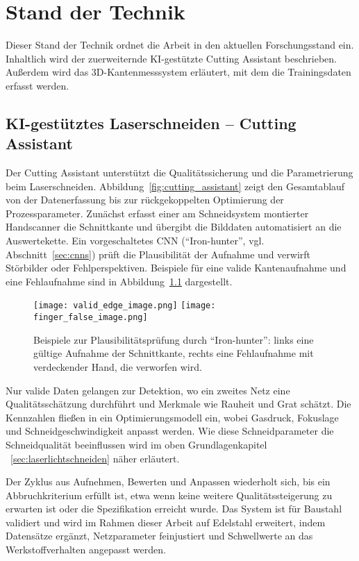 \chapter{Stand der Technik}

Dieser Stand der Technik ordnet die Arbeit in den aktuellen Forschungsstand ein. Inhaltlich wird der zuerweiternde KI-gestützte Cutting Assistant beschrieben. Außerdem wird das 3D-Kantenmesssystem erläutert, mit dem die Trainingsdaten erfasst werden.

\section{KI-gestütztes Laserschneiden – Cutting Assistant}
\label{sec:cutting-assistent}

Der Cutting Assistant unterstützt die Qualitätssicherung und die Parametrierung beim Laserschneiden. Abbildung~\ref{fig:cutting_assistant} zeigt den Gesamtablauf von der Datenerfassung bis zur rückgekoppelten Optimierung der Prozessparameter. Zunächst erfasst einer am Schneidsystem montierter Handscanner die Schnittkante und übergibt die Bilddaten automatisiert an die Auswertekette. Ein vorgeschaltetes CNN (\enquote{Iron-hunter}, vgl. Abschnitt~\ref{sec:cnns}) prüft die Plausibilität der Aufnahme und verwirft Störbilder oder Fehlperspektiven. Beispiele für eine valide Kantenaufnahme und eine Fehlaufnahme sind in Abbildung~\ref{fig:ok-nok-examples} dargestellt. 

\begin{figure}[!htbp]
    \centering
    \texttt{[image: valid\_edge\_image.png]}\hfill
    \texttt{[image: finger\_false\_image.png]}
    \caption{Beispiele zur Plausibilitätsprüfung durch \enquote{Iron-hunter}: links eine gültige Aufnahme der Schnittkante, rechts eine Fehlaufnahme mit verdeckender Hand, die verworfen wird.}
    \label{fig:ok-nok-examples}
\end{figure}

Nur valide Daten gelangen zur Detektion, wo ein zweites Netz eine Qualitätsschätzung durchführt und Merkmale wie Rauheit und Grat schätzt. Die Kennzahlen fließen in ein Optimierungsmodell ein, wobei Gasdruck, Fokuslage und Schneidgeschwindigkeit anpasst werden. Wie diese Schneidparameter die Schneidqualität beeinflussen wird im oben Grundlagenkapitel ~\ref{sec:laserlichtschneiden} näher erläutert.

Der Zyklus aus Aufnehmen, Bewerten und Anpassen wiederholt sich, bis ein Abbruchkriterium erfüllt ist, etwa wenn keine weitere Qualitätssteigerung zu erwarten ist oder die Spezifikation erreicht wurde. Das System ist für Baustahl validiert und wird im Rahmen dieser Arbeit auf Edelstahl erweitert, indem Datensätze ergänzt, Netzparameter feinjustiert und Schwellwerte an das Werkstoffverhalten angepasst werden.

